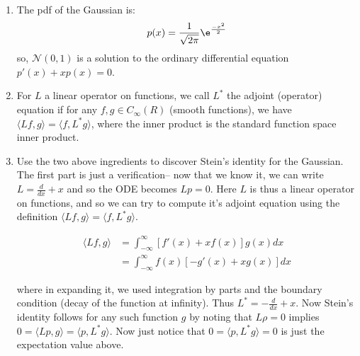 \documentclass[12pt]{article}
\begin{document}
\begin{enumerate}
    \item The pdf of the Gaussian is:
    \begin{equation}
        p(x)=\frac{1}{\sqrt{2\pi}}\e^{\frac{-x^2}{2}}
    \end{equation}
    so, $\mathcal{N}(0,1)$ is a solution to the ordinary differential equation $p'(x)+ xp(x)=0$.
    
    \item For $L$ a linear operator on functions, we call $L^*$ the adjoint (operator) equation if for any $f,g \in C_\infty(R)$ (smooth functions), we have $\langle Lf,g \rangle = \langle f,L^*g \rangle$, where the inner product is the standard function space inner product.
    
    \item Use the two above ingredients to discover Stein's identity for the Gaussian. The first part is just a verification-- now that we know it, we can write $L= \frac{d}{dx} + x$ and so the ODE becomes $Lp=0$. Here $L$ is thus a linear operator on functions, and so we can try to compute it's adjoint equation using the definition $\langle Lf,g \rangle = \langle f,L^*g \rangle$.
    
    \begin{align}
        \langle Lf,g \rangle &= \int_{-\infty}^\infty [f'(x) + xf(x)]g(x)dx \\ 
        &= \int_{-\infty}^\infty f(x)[−g'(x)+xg(x)]dx
    \end{align}
    
    \noindent where in expanding it, we used integration by parts and the boundary condition (decay of the function at infinity). Thus $L^*=−\frac{d}{dx}+x$. Now Stein's identity follows for any such function $g$ by noting that $Lρ=0$ implies $0=\langle Lp, g \rangle = \langle p, L^*g \rangle $. Now just notice that $0=\langle p, L^*g \rangle = 0$ is just the expectation value above.
    
\end{enumerate}

%


\end{document}
